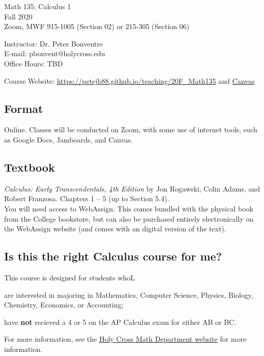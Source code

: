 \documentclass[11pt]{amsart}
\begin{document}
\thispagestyle{empty}

\begin{center}
{\Large
  Math 135: Calculus 1} \\
Fall 2020\\
Zoom, MWF 915-1005 (Section 02) or 215-305 (Section 06)
\end{center}


\normalsize
\begin{multicols}{2}
Instructor: Dr. Peter Bonventre\\
E-mail: pbonvent@holycross.edu\\

Office Hours:  TBD\\
\end{multicols}
\vspace{-2.7em}
Course Website: \url{https://petejb88.github.io/teaching/20F_Math135} and \href{https://hc.instructure.com}{Canvas}


\subsection*{Format} Online. Classes will be conducted on Zoom, with some use of internet tools, such as Google Docs, Jamboards, and Canvas.


\subsection*{Textbook}
\textit{Calculus: Early Transcendentals, 4th Edition} by Jon Rogawski, Colin Adams, and Robert Franzosa.
Chapters 1 -- 5 (up to Section 5.4).\\
You will need access to WebAssign. This comes bundled with the physical book from the College bookstore, but can also be purchased entirely electronically on the WebAssign website (and comes with an digital version of the text).



\subsection*{Is this the right Calculus course for me?}
This course is designed for students whoL
\begin{enumerate*}
\item are interested in majoring in Mathematics, Computer Science, Physics, Biology, Chemistry, Economics, or Accounting;
\item have \textbf{not} recieved a 4 or 5 on the AP Calculus exam for either AB or BC.        
\end{enumerate*}
For more information, see the
\href{https://mathcs.holycross.edu/~little/2019MATH135/Fall2019CalcLetter.pdf}{Holy Cross Math Department website}
for more information.
\end{document}
